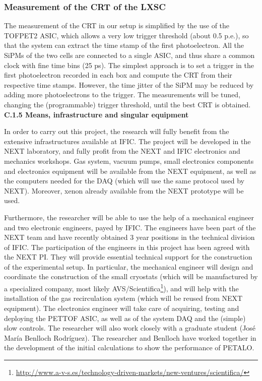 \subsubsection*{Measurement of the CRT of the LXSC}
The measurement of the CRT in our setup is simplified by the use of the TOFPET2 ASIC, which allows a very low trigger threshold (about 0.5 p.e.), so that the system can extract the time stamp of the first photoelectron. All the SiPMs of the two cells are connected to a single ASIC, and thus share a common clock with fine time bins (25 ps). The simplest approach is to set a trigger in the first photoelectron recorded in each box and compute the CRT from their respective time stamps. However, the time jitter of the SiPM may be reduced by adding more photoelectrons to the trigger. The measurements will be tuned, changing the (programmable) trigger threshold, until the best CRT is obtained. 
\\

\noindent\textbf{C.1.5 Means, infrastructure and singular equipment}

In order to carry out this project, the research will fully benefit from the extensive infrastructures available at IFIC. The project will be developed in the NEXT laboratory, and fully profit from the NEXT and IFIC electronics and mechanics workshops. Gas system, vacuum pumps, small electronics components and electronics equipment will be available from the NEXT equipment, as well as the computers needed for the DAQ (which will use the same protocol used by NEXT).  Moreover, xenon already available from the NEXT prototype will be used.

Furthermore, 
the researcher will be able to use the help of a mechanical engineer and two electronic engineers, payed by IFIC. The engineers have been part of the NEXT team and have recently obtained 3 year positions in the technical division of IFIC. The participation of the engineers in this project has been agreed with the NEXT PI. They will provide essential technical support for the construction of the experimental setup. In particular, the mechanical engineer will design and coordinate the construction of the small cryostats (which will be manufactured by a specialized company, most likely AVS/Scientifica\footnote{\url{http://www.a-v-s.es/technology-driven-markets/new-ventures/scientifica/}}), and will help with the installation of the gas recirculation system (which will be reused from NEXT equipment). The electronics engineer will take care of acquiring, testing and deploying the PETTOF ASIC, as well as of the system DAQ and the (simple) slow controls. The researcher will also work closely with a graduate student (Jos\'e Mar\'ia Benlloch Rodr\'iguez). The researcher and Benlloch have worked together in the development of the initial calculations to show the performance of PETALO. 

